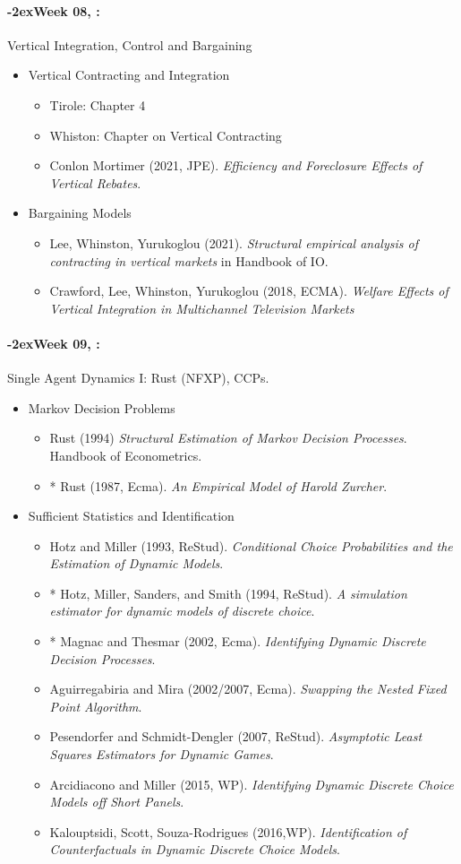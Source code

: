 \documentclass[11pt]{article}
\newcommand{\week}[1]{%
  \paragraph*{\kern-2ex\quad #1, \syldate{\today}:}%
  \AdvanceDate[7]%
}
\begin{document}
\week{Week 08} Vertical Integration, Control and Bargaining
\begin{itemize}
\item Vertical Contracting and Integration
\begin{itemize}
\item Tirole: Chapter 4
\item Whiston: Chapter on Vertical Contracting \url{}
\item Conlon Mortimer (2021, JPE). \textit{Efficiency and Foreclosure Effects of Vertical Rebates}.
\end{itemize}
\item Bargaining Models
\begin{itemize}
\item Lee, Whinston, Yurukoglou (2021). \textit{Structural empirical analysis of contracting in vertical markets} in Handbook of IO.
\item Crawford, Lee, Whinston, Yurukoglou (2018, ECMA). \textit{Welfare Effects of Vertical Integration in Multichannel Television Markets}
\end{itemize}
\end{itemize}

\week{Week 09} Single Agent Dynamics I: Rust (NFXP), CCPs.
\begin{itemize}
\item Markov Decision Problems
\begin{itemize}
\item Rust (1994) \textit{Structural Estimation of Markov Decision Processes}. Handbook of Econometrics.
\item * Rust (1987, Ecma). \textit{An Empirical Model of Harold Zurcher}.
\end{itemize}
\item Sufficient Statistics and Identification
\begin{itemize}
\item Hotz and Miller (1993, ReStud). \textit{Conditional Choice Probabilities and the Estimation of Dynamic Models}.
\item * Hotz, Miller, Sanders, and Smith (1994, ReStud). \textit{A simulation estimator for dynamic models of discrete choice}.
\item * Magnac and Thesmar (2002, Ecma). \textit{Identifying Dynamic Discrete Decision Processes}.
\item Aguirregabiria and Mira (2002/2007, Ecma). \textit{Swapping the Nested Fixed Point Algorithm}.
\item Pesendorfer and Schmidt-Dengler (2007, ReStud). \textit{Asymptotic Least Squares Estimators for Dynamic Games}.
\item Arcidiacono and Miller (2015, WP). \textit{Identifying Dynamic Discrete Choice Models
off Short Panels}.
\item Kalouptsidi, Scott, Souza-Rodrigues (2016,WP). \textit{Identification of Counterfactuals
in Dynamic Discrete Choice Models}.
\end{itemize}
\end{itemize}
\end{document}
